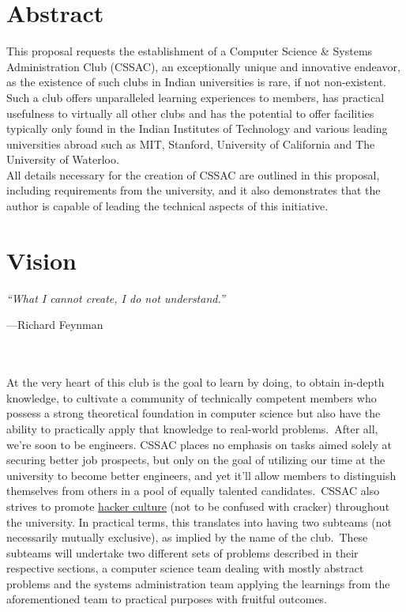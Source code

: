 \section{Abstract}\label{sec:abstract}
This proposal requests the establishment of a Computer Science \& Systems Administration Club (CSSAC), an
exceptionally unique and innovative endeavor, as the existence of such clubs in Indian universities is rare, if not
non-existent.
Such a club offers unparalleled learning experiences to members, has practical usefulness to virtually all other
clubs and has the potential to offer facilities typically only found in the Indian Institutes of Technology and
various leading universities abroad such as MIT, Stanford, University of California and The University of Waterloo.
\\
All details necessary for the creation of CSSAC are outlined in this proposal, including requirements from the
university, and it also demonstrates that the author is capable of leading the technical aspects of this initiative.




\section{Vision}\label{sec:vision}
\emph{``What I cannot create, I do not understand.''}{\par\hfill\small{---Richard Feynman}}
\\\\
At the very heart of this club is the goal to learn by doing, to obtain in-depth knowledge, to cultivate a community
of technically competent members who possess a strong theoretical foundation in computer science but also have the
ability to practically apply that knowledge to real-world problems.\ After all, we're soon to be engineers.
CSSAC places no emphasis on tasks aimed solely at securing better job prospects, but only on the goal of
utilizing our time at the university to become better engineers, and yet it'll allow members to distinguish
themselves from others in a pool of equally talented candidates.\ CSSAC also strives to promote
\href{https://wikipedia.org/wiki/Hacker_culture}{\color{blue}hacker culture} (not to be confused with
cracker) throughout the university.
In practical terms, this translates into having two subteams (not necessarily mutually exclusive), as implied by the
name of the club.\ These subteams will undertake two different sets of problems described in their respective
sections, a computer science team dealing with mostly abstract problems and the systems administration team applying
the learnings from the aforementioned team to practical purposes with fruitful outcomes.


